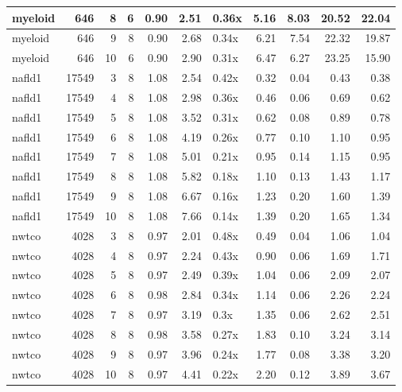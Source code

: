 \begin{table}[ht]
\begin{tabular}{lrrrrrlrrrr}
   \hline
myeloid & 646 &   8 &   6 & 0.90 & 2.51 & 0.36x & 5.16 & 8.03 & 20.52 & 22.04 \\ 
   \hline
myeloid & 646 &   9 &   8 & 0.90 & 2.68 & 0.34x & 6.21 & 7.54 & 22.32 & 19.87 \\ 
   \hline
myeloid & 646 &  10 &   6 & 0.90 & 2.90 & 0.31x & 6.47 & 6.27 & 23.25 & 15.90 \\ 
   \hline
nafld1 & 17549 &   3 &   8 & 1.08 & 2.54 & 0.42x & 0.32 & 0.04 & 0.43 & 0.38 \\ 
   \hline
nafld1 & 17549 &   4 &   8 & 1.08 & 2.98 & 0.36x & 0.46 & 0.06 & 0.69 & 0.62 \\ 
   \hline
nafld1 & 17549 &   5 &   8 & 1.08 & 3.52 & 0.31x & 0.62 & 0.08 & 0.89 & 0.78 \\ 
   \hline
nafld1 & 17549 &   6 &   8 & 1.08 & 4.19 & 0.26x & 0.77 & 0.10 & 1.10 & 0.95 \\ 
   \hline
nafld1 & 17549 &   7 &   8 & 1.08 & 5.01 & 0.21x & 0.95 & 0.14 & 1.15 & 0.95 \\ 
   \hline
nafld1 & 17549 &   8 &   8 & 1.08 & 5.82 & 0.18x & 1.10 & 0.13 & 1.43 & 1.17 \\ 
   \hline
nafld1 & 17549 &   9 &   8 & 1.08 & 6.67 & 0.16x & 1.23 & 0.20 & 1.60 & 1.39 \\ 
   \hline
nafld1 & 17549 &  10 &   8 & 1.08 & 7.66 & 0.14x & 1.39 & 0.20 & 1.65 & 1.34 \\ 
   \hline
nwtco & 4028 &   3 &   8 & 0.97 & 2.01 & 0.48x & 0.49 & 0.04 & 1.06 & 1.04 \\ 
   \hline
nwtco & 4028 &   4 &   8 & 0.97 & 2.24 & 0.43x & 0.90 & 0.06 & 1.69 & 1.71 \\ 
   \hline
nwtco & 4028 &   5 &   8 & 0.97 & 2.49 & 0.39x & 1.04 & 0.06 & 2.09 & 2.07 \\ 
   \hline
nwtco & 4028 &   6 &   8 & 0.98 & 2.84 & 0.34x & 1.14 & 0.06 & 2.26 & 2.24 \\ 
   \hline
nwtco & 4028 &   7 &   8 & 0.97 & 3.19 & 0.3x & 1.35 & 0.06 & 2.62 & 2.51 \\ 
   \hline
nwtco & 4028 &   8 &   8 & 0.98 & 3.58 & 0.27x & 1.83 & 0.10 & 3.24 & 3.14 \\ 
   \hline
nwtco & 4028 &   9 &   8 & 0.97 & 3.96 & 0.24x & 1.77 & 0.08 & 3.38 & 3.20 \\ 
   \hline
nwtco & 4028 &  10 &   8 & 0.97 & 4.41 & 0.22x & 2.20 & 0.12 & 3.89 & 3.67 \\ 
   \hline
\end{tabular}
\end{table}
